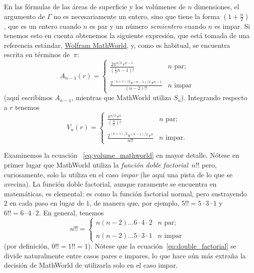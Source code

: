 En las fórmulas de las áreas de superficie y los volúmenes de $n$ dimensiones, el argumento de $\Gamma$ no es necesariamente un entero, sino que tiene la forma $\left(1 + \frac{n}{2}\right)$, que es un entero cuando $n$ es par y un número \emph{semientero} cuando $n$ es impar. Si tenemos esto en cuenta obtenemos la siguiente expresión, que está tomada de una referencia estándar, \href{http://mathworld.wolfram.com/Hypersphere.html}{Wolfram MathWorld}, y, como es habitual, se encuentra escrita en términos de~$\pi$:
\begin{equation}
\label{eq:surface_area_mathworld}
A_{n-1}(r) = \begin{cases}
\displaystyle \frac{2\pi^{n/2}\,r^{n-1}}{(\frac{1}{2}n - 1)!} & n \text{ par}; \\ \\
 \displaystyle \frac{2^{(n+1)/2}\pi^{(n-1)/2}\,r^{n-1}}{(n-2)!!} & n \text{ impar}
\end{cases}
\end{equation}
(aquí escribimos $A_{n-1}$, mientras que MathWorld utiliza $S_n$). Integrando respecto a $r$ tenemos
\begin{equation}
\label{eq:volume_mathworld}
V_n(r) = \begin{cases}
\displaystyle \frac{\pi^{n/2}\,r^n}{(\frac{n}{2})!} & n \text{ par}; \\ \\
\displaystyle \frac{2^{(n+1)/2}\pi^{(n-1)/2}\,r^n}{n!!} & n \text{ impar}.
\end{cases}
\end{equation}

Examinemos la ecuación ~\eqref{eq:volume_mathworld} en mayor detalle. Nótese en primer lugar que MathWorld utiliza la \emph{función doble factorial}~$n!!$ pero, curiosamente, solo la utiliza en el caso \emph{impar} (he aquí una pista de lo que se avecina). La función doble factorial, aunque raramente se encuentra en matemáticas, es elemental: es como la función factorial normal, pero sustrayendo $2$ en cada paso en lugar de $1$, de manera que, por ejemplo, $5!! = 5 \cdot 3 \cdot 1$ y $6!! = 6 \cdot 4 \cdot 2$. En general, tenemos
\begin{equation}
\label{eq:double_factorial}
n!! = \begin{cases}
n(n-2)\ldots6\cdot4\cdot2 & n \text{ par}; \\ \\
n(n-2)\ldots5\cdot3\cdot1 & n \text{ impar}
\end{cases}
\end{equation}
(por definición, $0!! = 1!! = 1$). Nótese que la ecuación~\eqref{eq:double_factorial} se divide naturalmente entre casos pares e impares, lo que hace aún más extraña la decisión de MathWorld de utilizarla solo en el caso impar.


